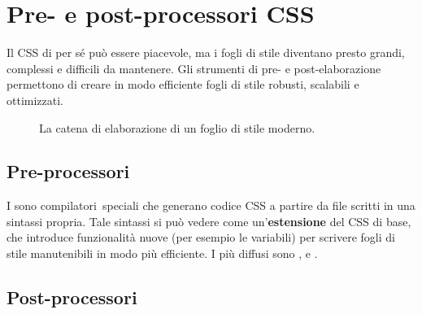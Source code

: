 \section{Pre- e post-processori CSS}

Il CSS di per sé può essere piacevole, ma i fogli di stile diventano presto
grandi, complessi e difficili da mantenere. Gli strumenti di pre- e
post-elaborazione permettono di creare in modo efficiente fogli di stile
robusti, scalabili e ottimizzati.

\begin{figure}[H]
  \centering
  \caption{La catena di elaborazione di un foglio di stile moderno.}
  \label{fig:css-pipeline}
\end{figure}

\subsection{Pre-processori}

I  sono \guillemotleft compilatori\guillemotright\
speciali che generano codice CSS a partire da file scritti in una sintassi
propria. Tale sintassi si può vedere come un'\textbf{estensione} del CSS di
base, che introduce funzionalità nuove (per esempio le variabili) per scrivere
fogli di stile manutenibili in modo più efficiente. I più diffusi sono
\term{Sass}, \term{LESS} e \term{Stylus}.

\subsection{Post-processori}

